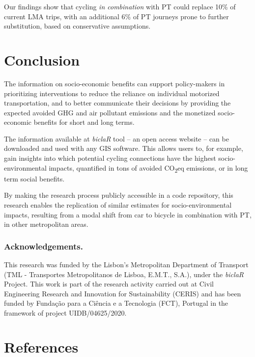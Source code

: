 \documentclass[runningheads]{llncs}
\begin{document}
Our findings show that cycling \emph{in combination} with PT could
replace 10\% of current LMA trips, with an additional 6\% of PT journeys
prone to further substitution, based on conservative assumptions.

\section{Conclusion}\label{conclusion}

The information on socio-economic benefits can support policy-makers in
prioritizing interventions to reduce the reliance on individual
motorized transportation, and to better communicate their decisions by
providing the expected avoided GHG and air pollutant emissions and the
monetized socio-economic benefits for short and long terms.

The information available at \emph{biclaR} tool -- an open access
website -- can be downloaded and used with any GIS software. This allows
users to, for example, gain insights into which potential cycling
connections have the highest socio-environmental impacts, quantified in
tons of avoided CO\textsubscript{2}eq emissions, or in long term social
benefits.

By making the research process publicly accessible in a code repository,
this research enables the replication of similar estimates for
socio-environmental impacts, resulting from a modal shift from car to
bicycle in combination with PT, in other metropolitan areas.

\subsubsection*{Acknowledgements.}\label{acknowledgements.}

This research was funded by the Lisbon's Metropolitan Department of
Transport (TML - Transportes Metropolitanos de Lisboa, E.M.T., S.A.),
under the \emph{biclaR} Project. This work is part of the research
activity carried out at Civil Engineering Research and Innovation for
Sustainability (CERIS) and has been funded by Fundação para a Ciência e
a Tecnologia (FCT), Portugal in the framework of project
UIDB/04625/2020.

\section*{References}\label{references}
\end{document}

